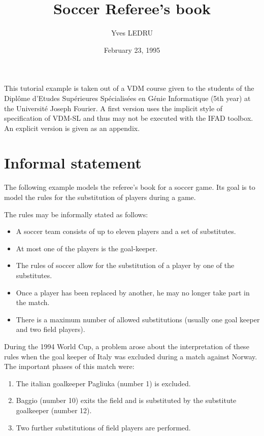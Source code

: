 \documentclass{article}
\title{Soccer Referee's book}
\author{Yves LEDRU\footnotemark}
\date{February 23, 1995}
\begin{document}
\maketitle
{}

This tutorial example is taken out of a  VDM course given
to the students of the Dipl\^{o}me d'Etudes Sup\'erieures Sp\'ecialis\'ees en
G\'enie Informatique (5th year) at the Universit\'e Joseph Fourier. A first 
version uses the implicit style of specification of VDM-SL and thus may not be
executed with the IFAD toolbox. An explicit version is given as an appendix.

\section{Informal statement}

The following example models the referee's book for a soccer game. Its goal is
to model the rules for the substitution of players during a game.

The rules may be informally stated as follows:

\begin{itemize}
\item A soccer team consists of up to eleven players and a set of substitutes.
\item At most one of the players is the goal-keeper. 
\item The rules of soccer allow for the substitution of a player by one of the
substitutes. 
\item Once a player has been replaced by another, he may no longer take part in
the match.
\item There is a maximum number of allowed substitutions (usually one goal
keeper and two field players).
\end{itemize}
 
During the 1994 World Cup, a problem arose about the interpretation of these
rules when the goal keeper of Italy was excluded during a match against Norway.
The important phases of this match
were: 

\begin{enumerate}
\item The italian goalkeeper Pagliuka (number 1) is excluded.
\item Baggio (number 10) exits the field and is substituted by the substitute
goalkeeper (number 12).
\item Two further substitutions of field players are performed.
\end{enumerate}
\end{document}
